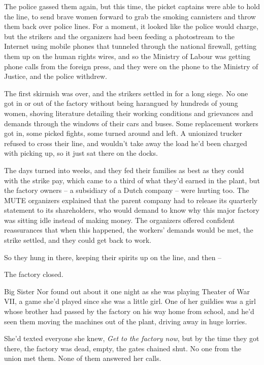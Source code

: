 The police gassed them again, but this time, the picket captains
were able to hold the line, to send brave women forward to grab the
smoking cannisters and throw them back over police lines. For a
moment, it looked like the police would charge, but the strikers
and the organizers had been feeding a photostream to the Internet
using mobile phones that tunneled through the national firewall,
getting them up on the human rights wires, and so the Ministry of
Labour was getting phone calls from the foreign press, and they
were on the phone to the Ministry of Justice, and the police
withdrew.

The first skirmish was over, and the strikers settled in for a long
siege. No one got in or out of the factory without being harangued
by hundreds of young women, shoving literature detailing their
working conditions and grievances and demands through the windows
of their cars and buses. Some replacement workers got in, some
picked fights, some turned around and left. A unionized trucker
refused to cross their line, and wouldn't take away the load he'd
been charged with picking up, so it just sat there on the docks.

The days turned into weeks, and they fed their families as best as
they could with the strike pay, which came to a third of what
they'd earned in the plant, but the factory owners -- a subsidiary
of a Dutch company -- were hurting too. The MUTE organizers
explained that the parent company had to release its quarterly
statement to its shareholders, who would demand to know why this
major factory was sitting idle instead of making money. The
organizers offered confident reassurances that when this happened,
the workers' demands would be met, the strike settled, and they
could get back to work.

So they hung in there, keeping their spirits up on the line, and
then --

The factory closed.

Big Sister Nor found out about it one night as she was playing
Theater of War VII, a game she'd played since she was a little
girl. One of her guildies was a girl whose brother had passed by
the factory on his way home from school, and he'd seen them moving
the machines out of the plant, driving away in huge lorries.

She'd texted everyone she knew, \emph{Get to the factory now}, but
by the time they got there, the factory was dead, empty, the gates
chained shut. No one from the union met them. None of them answered
her calls.

